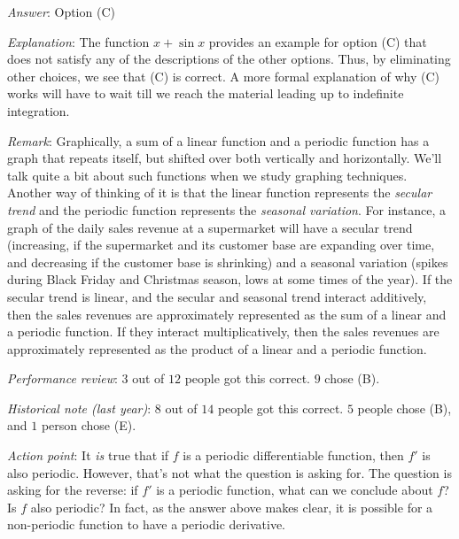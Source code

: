 \documentclass[10pt]{amsart}
\begin{document}
\begin{enumerate}
  {\em Answer}: Option (C)

  {\em Explanation}: The function $x + \sin x$ provides an example for
  option (C) that does not satisfy any of the descriptions of the
  other options. Thus, by eliminating other choices, we see that (C)
  is correct. A more formal explanation of why (C) works will have to
  wait till we reach the material leading up to indefinite
  integration.

  {\em Remark}: Graphically, a sum of a linear function and a periodic
  function has a graph that repeats itself, but shifted over both
  vertically and horizontally. We'll talk quite a bit about such
  functions when we study graphing techniques. Another way of thinking
  of it is that the linear function represents the {\em secular trend}
  and the periodic function represents the {\em seasonal
  variation}. For instance, a graph of the daily sales revenue at a
  supermarket will have a secular trend (increasing, if the
  supermarket and its customer base are expanding over time, and
  decreasing if the customer base is shrinking) and a seasonal
  variation (spikes during Black Friday and Christmas season, lows at
  some times of the year). If the secular trend is linear, and the
  secular and seasonal trend interact additively, then the sales
  revenues are approximately represented as the sum of a linear and a
  periodic function. If they interact multiplicatively, then the sales
  revenues are approximately represented as the product of a linear
  and a periodic function.

  {\em Performance review}: $3$ out of $12$ people got this
  correct. $9$ chose (B).

  {\em Historical note (last year)}: $8$ out of $14$ people got this
  correct. $5$ people chose (B), and $1$ person chose (E).

  {\em Action point}: It {\em is} true that if $f$ is a periodic
  differentiable function, then $f'$ is also periodic. However, that's
  not what the question is asking for. The question is asking for the
  reverse: if $f'$ is a periodic function, what can we conclude about
  $f$? Is $f$ also periodic? In fact, as the answer above makes clear,
  it is possible for a non-periodic function to have a periodic
  derivative.
\end{enumerate}
\end{document}
